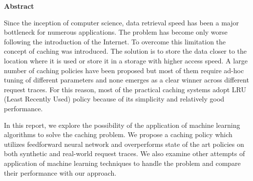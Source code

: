 
\Large \textbf{Abstract}

\normalsize
Since the inception of computer science, data retrieval speed has been a major bottleneck for numerous applications. The problem has become only worse following the introduction of the Internet. To overcome this limitation the concept of caching was introduced. The solution is to store the data closer to the location where it is used or store it in a storage with higher access speed. A large number of caching policies have been proposed but most of them require ad-hoc tuning of different parameters and none emerges as a clear winner across different request traces. For this reason, most of the practical caching systems adopt LRU (Least Recently Used) policy because of its simplicity and relatively good performance.

In this report, we explore the possibility of the application of machine learning algorithms to solve the caching problem. We propose a caching policy which utilizes feedforward neural network and overperforms state of the art policies on both synthetic and real-world request traces. We also examine other attempts of application of machine learning techniques to handle the problem and compare their performance with our approach.

